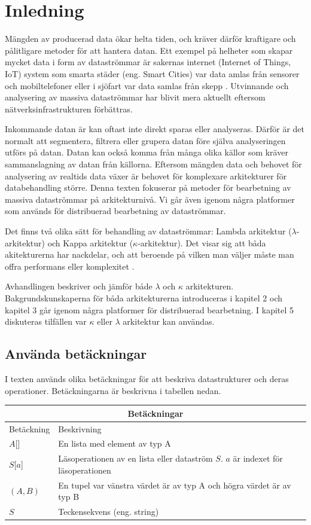 \chapter{Inledning}

Mängden av producerad data ökar helta tiden, och kräver därför kraftigare och pålitligare
metoder för att hantera datan. Ett exempel på helheter som skapar mycket data i form av
dataströmmar är sakernas internet (Internet of Things, IoT) system som smarta städer
(eng. Smart Cities) var data amlas från sensorer och mobiltelefoner \citep{vakali2014smart}
eller i sjöfart var data samlas från skepp \citep{xu2019internet}. Utvinnande och analysering
av massiva dataströmmar har blivit mera aktuellt eftersom nätverksinfrastrukturen förbättras.

Inkommande datan är kan oftast inte direkt sparas eller analyseras. Därför är det normalt att
segmentera, filtrera eller grupera datan före själva analyseringen utförs på datan.
Datan kan också komma från många olika källor \citep{beringer2006online} som kräver sammanslagning
av datan från källorna. Eftersom mängden data och behovet för analysering av realtids data växer
är behovet för komplexare arkitekturer för databehandling större. Denna texten fokuserar på metoder för
bearbetning av massiva dataströmmar på arkitekturnivå. Vi går även 
igenom några platformer som används för distribuerad bearbetning av dataströmmar.

Det finns två olika sätt för behandling av dataströmmar: Lambda arkitektur 
($\lambda$-arkitektur) och Kappa arkitektur ($\kappa$-arkitektur). Det visar sig att
båda akitekturerna har nackdelar, och att beroende på vilken man väljer måste man
offra performans eller komplexitet \citep{mci/Feick2018}.

Avhandlingen beskriver och jämför både $\lambda$ och $\kappa$ arkitekturen. Bakgrundskunskaperna
för båda arkitekturerna introduceras i kapitel 2 och kapitel 3 går 
igenom några platformer för distribuerad bearbetning. I kapitel 5 diskuteras tilfällen var $\kappa$ 
eller $\lambda$ arkitektur kan användas.

\section{Använda betäckningar}

I texten används olika betäckningar för att beskriva datastrukturer och deras operationer. Betäckningarna är beskrivna i tabellen nedan.

\begin{tabular}{ |p{3cm}||p{8cm}|  }
 \hline
 \multicolumn{2}{|c|}{Betäckningar} \\
 \hline
 Betäckning & Beskrivning\\
 \hline
  $A$[]   &  En lista med element av typ A \\
 $S$[$a$]   &  Läsoperationen av en lista eller dataström $S$. $a$ är indexet för läsoperationen \\
 $(A, B)$   &  En tupel var vänstra värdet är av typ A och högra värdet är av typ B\\
 $S$ & Teckensekvens (eng. string)\\
 \hline
\end{tabular}



